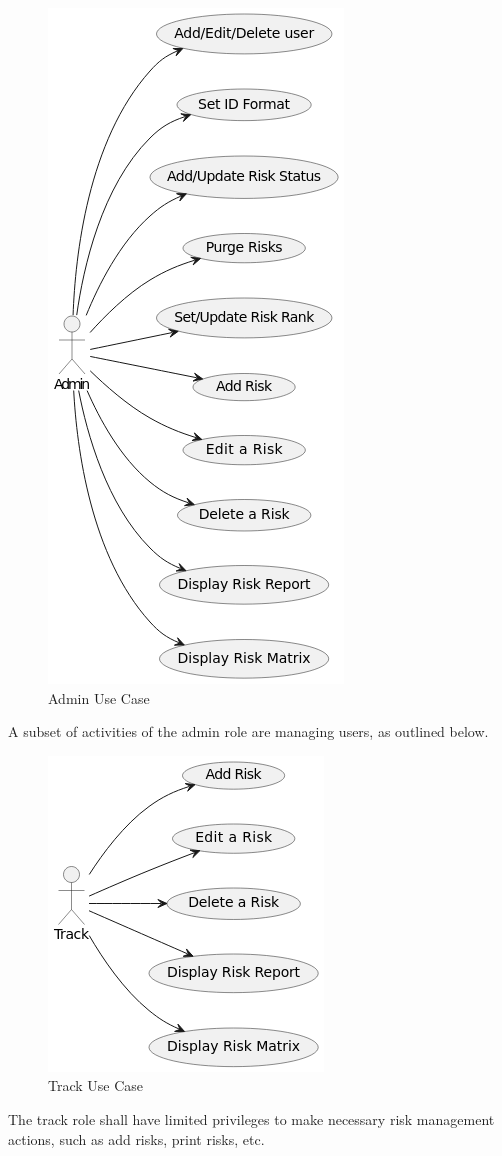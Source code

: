 \documentclass[letterpaper,12pt,oneside,listof=totoc]{scrreprt}
\begin{document}
    \begin{figure} [H]
        \centering
        \includegraphics[width=0.4\linewidth]{AdminUserCase.jpg}
        \caption{Admin Use Case}
        \label{adminRole}
    \end{figure}
    
    A subset of activities of the admin role are managing users, as outlined below.
    
    \begin{figure} [H]
        \centering
        \includegraphics[width=0.5\linewidth]{TrackUserCase.jpg}
        \caption{Track Use Case}
        \label{trackRole}
    \end{figure}
    
    The track role shall have limited privileges to make necessary risk management actions, such as add risks, print risks, etc.
    
\end{document}

